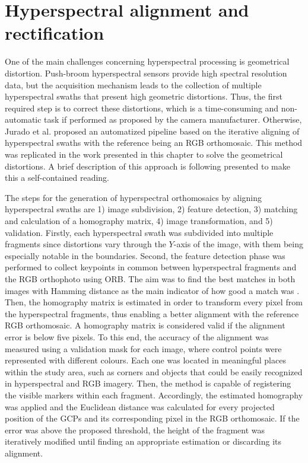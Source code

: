 \section{Hyperspectral alignment and rectification}

One of the main challenges concerning hyperspectral processing is geometrical distortion. Push-broom hyperspectral sensors provide high spectral resolution data, but the acquisition mechanism leads to the collection of multiple hyperspectral swaths that present high geometric distortions. Thus, the first required step is to correct these distortions, which is a time-consuming and non-automatic task if performed as proposed by the camera manufacturer. Otherwise, Jurado et al. \cite{jurado_efficient_2021} proposed an automatized pipeline based on the iterative aligning of hyperspectral swaths with the reference being an RGB orthomosaic. This method was replicated in the work presented in this chapter to solve the geometrical distortions. A brief description of this approach is following presented to make this a self-contained reading.

The steps for the generation of hyperspectral orthomosaics by aligning hyperspectral swaths are 1) image subdivision, 2) feature detection, 3) matching and calculation of a homography matrix, 4) image transformation, and 5) validation. Firstly, each hyperspectral swath was subdivided into multiple fragments since distortions vary through the $Y$-axis of the image, with them being especially notable in the boundaries. Second, the feature detection phase was performed to collect keypoints in common between hyperspectral fragments and the RGB orthophoto using ORB. The aim was to find the best matches in both images with Hamming distance as the main indicator of how good a match was \cite{norouzi_hamming_2012}. Then, the homography matrix is estimated in order to transform every pixel from the hyperspectral fragments, thus enabling a better alignment with the reference RGB orthomosaic. A homography matrix is considered valid if the alignment error is below five pixels. To this end, the accuracy of the alignment was measured using a validation mask for each image, where control points were represented with different colours. Each one was located in meaningful places within the study area, such as corners and objects that could be easily recognized in hyperspectral and RGB imagery. Then, the method is capable of registering the visible markers within each fragment. Accordingly, the estimated homography was applied and the Euclidean distance was calculated for every projected position of the GCPs and its corresponding pixel in the RGB orthomosaic. If the error was above the proposed threshold, the height of the fragment was iteratively modified until finding an appropriate estimation or discarding its alignment.

